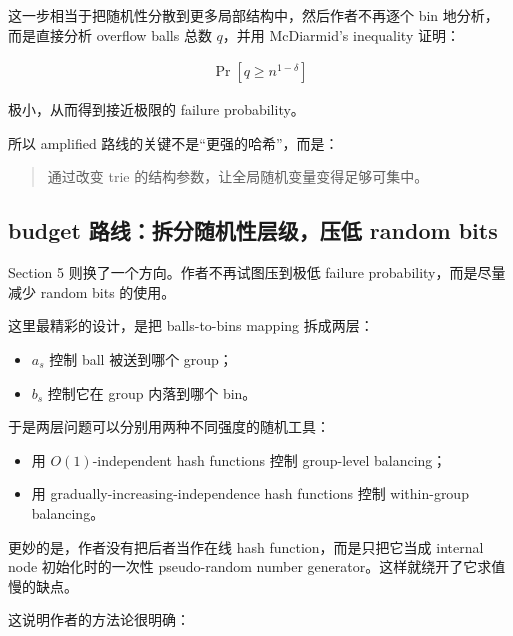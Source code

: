 \documentclass[12pt]{article}
\begin{document}
这一步相当于把随机性分散到更多局部结构中，然后作者不再逐个 bin 地分析，而是直接分析 overflow balls 总数 \(q\)，并用 McDiarmid’s inequality 证明\cite[Sec.~4]{kuszmaul2022}：

\[\begin{aligned}
\Pr[q \ge n^{1-\delta}]
\end{aligned}\]

极小，从而得到接近极限的 failure probability。

所以 amplified 路线的关键不是“更强的哈希”，而是：

\begin{quote}通过改变 trie 的结构参数，让全局随机变量变得足够可集中。\end{quote}

\subsection{budget 路线：拆分随机性层级，压低 random bits}

Section 5 则换了一个方向。作者不再试图压到极低 failure probability，而是尽量减少 random bits 的使用。

这里最精彩的设计，是把 balls-to-bins mapping 拆成两层：

\begin{itemize}

\item \(a_s\) 控制 ball 被送到哪个 group；

\item \(b_s\) 控制它在 group 内落到哪个 bin。

\end{itemize}

于是两层问题可以分别用两种不同强度的随机工具：

\begin{itemize}

\item 用 \(O(1)\)-independent hash functions 控制 group-level balancing；

\item 用 gradually-increasing-independence hash functions 控制 within-group balancing。

\end{itemize}

更妙的是，作者没有把后者当作在线 hash function，而是只把它当成 internal node 初始化时的一次性 pseudo-random number generator。这样就绕开了它求值慢的缺点\cite[Sec.~5]{kuszmaul2022}\cite{celis2011,meka2014}。

这说明作者的方法论很明确：
\end{document}
